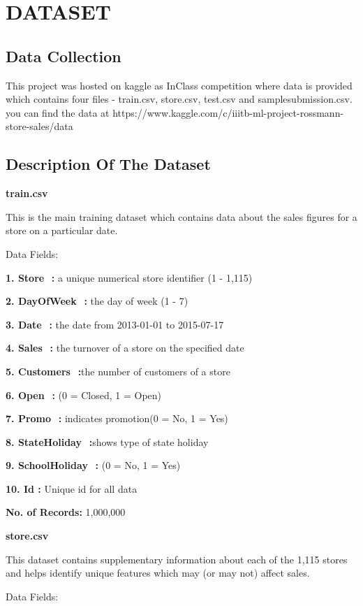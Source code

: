 \documentclass[letterpaper, 10 pt, conference]{ieeeconf}  %
\begin{document}
\section{DATASET}

\subsection{Data Collection}

This project was hosted on kaggle as InClass competition where data is provided which contains four files - train.csv, store.csv, test.csv and samplesubmission.csv. you can find the data at https://www.kaggle.com/c/iiitb-ml-project-rossmann-store-sales/data

\subsection{Description Of The Dataset}\bigskip

\textbf{train.csv} \bigskip

This is the main training dataset which contains data about the sales figures for a store on a particular date.

Data Fields:

\textbf{1. Store ​ :} a unique numerical store identifier (1 - 1,115)

\textbf{2. DayOfWeek ​ :} the day of week (1 - 7)

\textbf{3. Date ​ :} the date from 2013-01-01 to 2015-07-17

\textbf{4. Sales ​ :} the turnover of a store on the specified date

\textbf{5. Customers ​ :}the number of customers of a store

\textbf{6. Open ​ :}  (0 = Closed, 1 = Open)

\textbf{7. Promo ​ :} indicates promotion(0 = No, 1 = Yes)

\textbf{8. StateHoliday ​ :}shows type of state holiday

\textbf{9. SchoolHoliday ​ :} (0 = No, 1 = Yes)

\textbf{10. Id :} Unique id for all data

\textbf{No. of Records:​} 1,000,000\bigskip

\textbf{store.csv}\bigskip

This dataset contains supplementary information about each of the 1,115 stores and helps identify unique features which may (or may not) affect sales.

Data Fields:
\end{document}

